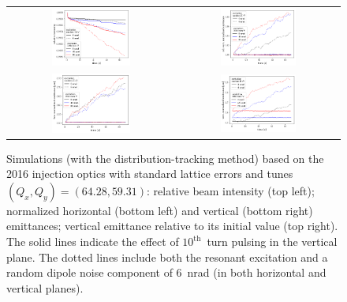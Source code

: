 \documentclass[%
 reprint,
 amsmath,amssymb,
 aps,
prstab,
longbibliography
]{revtex4-1}
\begin{document}
\begin{figure}
  \begin{tabular}{cc}
    \includegraphics[width=0.49\textwidth]{2016injerra2b2uran1_2e-3_10thV_3_5um_intensity.png} &
    \includegraphics[width=0.49\textwidth]{2016injerra2b2uran1_2e-3_10thV_3_5um_emit2_rel.png} \\
    \includegraphics[width=0.49\textwidth]{2016injerra2b2uran1_2e-3_10thV_3_5um_emit1.png} &
    \includegraphics[width=0.49\textwidth]{2016injerra2b2uran1_2e-3_10thV_3_5um_emit2.png} \\
  \end{tabular}	
  \caption{Simulations (with the distribution-tracking method) based
    on the 2016 injection optics with standard lattice errors and
    tunes $(Q_x, Q_y) = (64.28, 59.31)$: relative beam intensity (top
    left); normalized horizontal (bottom left) and vertical (bottom
    right) emittances; vertical emittance relative to its initial
    value (top right). The solid lines indicate the effect of
    $10^{\mathrm{th}}$~turn pulsing in the vertical plane. The dotted
    lines include both the resonant excitation and a random dipole
    noise component of 6~nrad (in both horizontal and vertical
    planes).}
  \label{fig:10thsim}
\end{figure}
\end{document}
